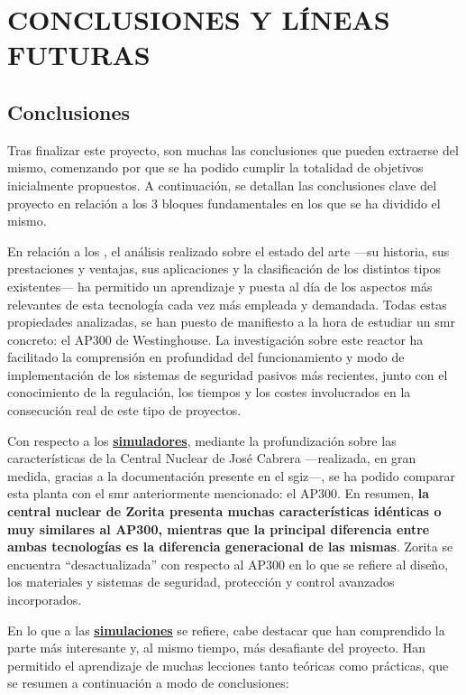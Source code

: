 \newpage
\section{CONCLUSIONES Y LÍNEAS FUTURAS} \label{conclusiones}

\subsection{Conclusiones}

Tras finalizar este proyecto, son muchas las conclusiones que pueden extraerse del mismo, comenzando por que se ha podido cumplir la totalidad de objetivos inicialmente propuestos. A continuación, se detallan las conclusiones clave del proyecto en relación a los 3 bloques fundamentales en los que se ha dividido el mismo.

En relación a los \underline{\textbf{}}, el análisis realizado sobre el estado del arte ---su historia, sus prestaciones y ventajas, sus aplicaciones y la clasificación de los distintos tipos existentes--- ha permitido un aprendizaje y puesta al día de los aspectos más relevantes de esta tecnología cada vez más empleada y demandada. Todas estas propiedades analizadas, se han puesto de manifiesto a la hora de estudiar un \acrlong{smr} concreto: el AP300 de Westinghouse. La investigación sobre este reactor ha facilitado la comprensión en profundidad del funcionamiento y modo de implementación de los sistemas de seguridad pasivos más recientes, junto con el conocimiento de la regulación, los tiempos y los costes involucrados en la consecución real de este tipo de proyectos.

Con respecto a los \underline{\textbf{simuladores}}, mediante la profundización sobre las características de la Central Nuclear de José Cabrera ---realizada, en gran medida, gracias a la documentación presente en el \acrshort{sgiz}---, se ha podido comparar esta planta con el \acrshort{smr} anteriormente mencionado: el AP300. En resumen, \textbf{la central nuclear de Zorita presenta muchas características idénticas o muy similares al AP300, mientras que la principal diferencia entre ambas tecnologías es la diferencia generacional de las mismas}. Zorita se encuentra ``desactualizada'' con respecto al AP300 en lo que se refiere al diseño, los materiales y sistemas de seguridad, protección y control avanzados incorporados.

En lo que a las \underline{\textbf{simulaciones}} se refiere, cabe destacar que han comprendido la parte más interesante y, al mismo tiempo, más desafiante del proyecto. Han permitido el aprendizaje de muchas lecciones tanto teóricas como prácticas, que se resumen a continuación a modo de conclusiones:

